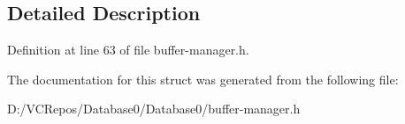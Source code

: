\subsection{Detailed Description}


Definition at line 63 of file buffer-\/manager.\+h.



The documentation for this struct was generated from the following file\+:\begin{DoxyCompactItemize}
\item 
D\+:/\+V\+C\+Repos/\+Database0/\+Database0/buffer-\/manager.\+h\end{DoxyCompactItemize}
